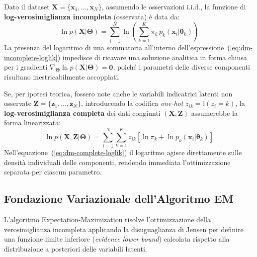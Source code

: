Dato il dataset $\mathbf{X} = \{\mathbf{x}_1, \dots, \mathbf{x}_N\}$, assumendo le osservazioni i.i.d., la funzione di \textbf{log-verosimiglianza incompleta} (osservata) è data da:
\begin{equation}
\label{eq:dm-incomplete-loglik}
\ln p(\mathbf{X} | \boldsymbol{\Theta}) = \sum_{i=1}^N \ln \left( \sum_{k=1}^K \pi_k \, p_k(\mathbf{x}_i | \boldsymbol{\theta}_k) \right)
\end{equation}
La presenza del logaritmo di una sommatoria all'interno dell'espressione~(\ref{eq:dm-incomplete-loglik}) impedisce di ricavare una soluzione analitica in forma chiusa per i gradienti $\nabla_{\boldsymbol{\Theta}} \ln p(\mathbf{X} | \boldsymbol{\Theta}) = \mathbf{0}$, poiché i parametri delle diverse componenti risultano inestricabilmente accoppiati.

Se, per ipotesi teorica, fossero note anche le variabili indicatrici latenti non osservate $\mathbf{Z} = \{\mathbf{z}_1, \dots, \mathbf{z}_N\}$, introducendo la codifica \textit{one-hot} $z_{ik} = \mathbb{I}(z_i = k)$, la \textbf{log-verosimiglianza completa} dei dati congiunti $(\mathbf{X}, \mathbf{Z})$ assumerebbe la forma linearizzata:
\begin{equation}
\label{eq:dm-complete-loglik}
\ln p(\mathbf{X}, \mathbf{Z} | \boldsymbol{\Theta}) = \sum_{i=1}^N \sum_{k=1}^K z_{ik} \left[ \ln \pi_k + \ln p_k(\mathbf{x}_i | \boldsymbol{\theta}_k) \right]
\end{equation}
Nell'equazione~(\ref{eq:dm-complete-loglik}) il logaritmo agisce direttamente sulle densità individuali delle componenti, rendendo immediata l'ottimizzazione separata per ciascun parametro.

\subsection{Fondazione Variazionale dell'Algoritmo EM}

L'algoritmo Expectation-Maximization risolve l'ottimizzazione della verosimiglianza incompleta applicando la disuguaglianza di Jensen per definire una funzione limite inferiore (\textit{evidence lower bound}) calcolata rispetto alla distribuzione a posteriori delle variabili latenti.

